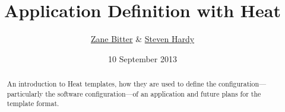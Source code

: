 \documentclass{tufte-handout}
\title{Application Definition with Heat}
\author{\href{mailto:zbitter@redhat.com}{Zane Bitter} \& \href{mailto:shardy@redhat.com}{Steven Hardy}}
\date{10 September 2013}
\begin{document}
\maketitle

\marginnote{\tableofcontents \vspace{2em}}

\begin{abstract}
An introduction to Heat templates, how they are used to define the configuration---particularly the software configuration---of an application and future plans for the template format.
\end{abstract}










\end{document}
